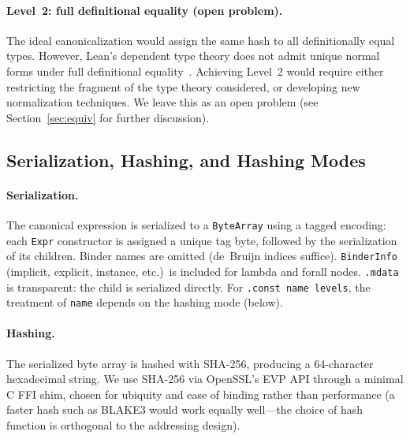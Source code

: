 \paragraph{Level~2: full definitional equality (open problem).}
The ideal canonicalization would assign the same hash to all
definitionally equal types.  However, Lean's dependent type theory does
not admit unique normal forms under full definitional
equality~\cite{abel2018decidability}.  Achieving Level~2 would require
either restricting the fragment of the type theory considered, or
developing new normalization techniques.  We leave this as an open
problem (see Section~\ref{sec:equiv} for further discussion).



\subsection{Serialization, Hashing, and Hashing Modes}
\label{sec:serial}

\paragraph{Serialization.}
The canonical expression is serialized to a \texttt{ByteArray} using a
tagged encoding: each \texttt{Expr} constructor is assigned a unique tag
byte, followed by the serialization of its children.  Binder names are
omitted (de~Bruijn indices suffice).  \texttt{BinderInfo} (implicit,
explicit, instance, etc.)\ is included for lambda and forall nodes.
\texttt{.mdata} is transparent: the child is serialized directly.  For
\texttt{.const name levels}, the treatment of \texttt{name} depends on
the hashing mode (below).


\paragraph{Hashing.}
The serialized byte array is hashed with SHA-256, producing a
64-character hexadecimal string.  We use SHA-256 via OpenSSL's EVP API
through a minimal C FFI shim, chosen for ubiquity and ease of binding
rather than performance (a faster hash such as BLAKE3 would work equally
well---the choice of hash function is orthogonal to the addressing
design).

